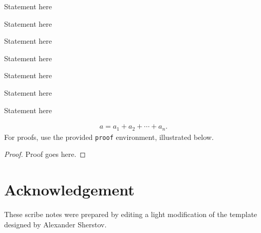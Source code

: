 \documentclass[usletter]{article}
\begin{document}
\begin{definition}
Statement here
\end{definition}

\begin{example}
Statement here
\end{example}

\begin{assumption}
Statement here
\end{assumption}

\begin{remark}
Statement here
\end{remark}

\begin{conjecture}
Statement here
\end{conjecture}

\begin{openproblem}
Statement here
\end{openproblem}

\begin{problem}
Statement here
\end{problem}


\noindent
\begin{align}
a = a_1+a_2+\cdots+a_n.
\end{align}
\noindent
For proofs, use the provided {\tt proof} environment,
illustrated below.

\begin{proof}
Proof goes here.
\end{proof}

\section*{Acknowledgement}
These scribe notes were prepared by editing a light modification of the template designed by Alexander Sherstov.



\end{document}
